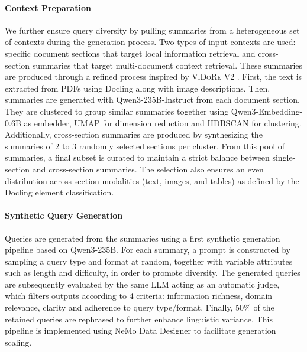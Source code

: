 \paragraph{Context Preparation} We further ensure query diversity by pulling summaries from a heterogeneous set of contexts during the generation process.
Two types of input contexts are used: specific document sections that target local information retrieval and cross-section summaries that target multi-document context retrieval. These summaries are produced through a refined process inspired by \textsc{ViDoRe} V2 . First, the text is extracted from PDFs using Docling  along with image descriptions. Then, summaries are generated with Qwen3-235B-Instruct  from each document section. They are clustered to group similar summaries together using Qwen3-Embedding-0.6B  as embedder, UMAP  for dimension reduction and HDBSCAN  for clustering. Additionally, cross-section summaries are produced by synthesizing the summaries of 2 to 3 randomly selected sections per cluster. From this pool of summaries, a final subset is curated to maintain a strict balance between single-section and cross-section summaries. The selection also ensures an even distribution across section modalities (text, images, and tables) as defined by the Docling element classification.

\paragraph{Synthetic Query Generation} Queries are generated from the summaries using a first synthetic generation pipeline based on Qwen3-235B. For each summary, a prompt is constructed by sampling a query type and format at random, together with variable attributes such as length and difficulty, in order to promote diversity. The generated queries are subsequently evaluated by the same LLM acting as an automatic judge, which filters outputs according to 4 criteria: information richness, domain relevance, clarity and adherence to query type/format. Finally, 50\% of the retained queries are rephrased to further enhance linguistic variance. This pipeline is implemented using NeMo Data Designer  to facilitate generation scaling.

